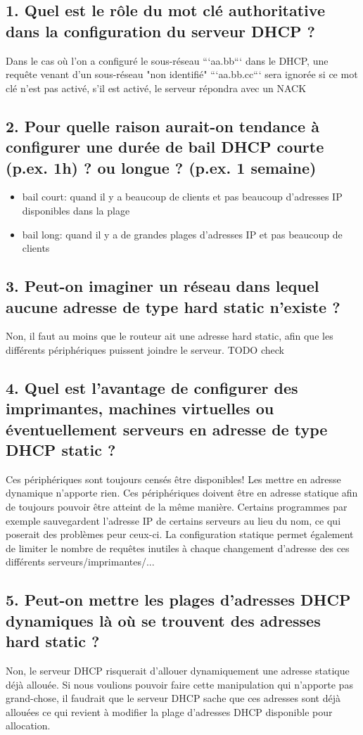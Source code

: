 \documentclass{article}
\begin{document}
\subsection*{1. Quel est le rôle du mot clé authoritative dans la configuration du serveur DHCP ?}
Dans le cas où l'on a configuré le sous-réseau ```aa.bb``` dans le DHCP, une requête venant d'un sous-réseau "non identifié" ```aa.bb.cc``` sera ignorée si ce mot clé n'est pas activé, s'il est activé, le serveur répondra avec un NACK

\subsection*{2. Pour quelle raison aurait-on tendance à configurer une durée de bail DHCP courte (p.ex. 1h) ? ou longue ? (p.ex. 1 semaine)}
\begin{itemize}
\item bail court: quand il y a beaucoup de clients et pas beaucoup d'adresses IP disponibles dans la plage
\item bail long: quand il y a de grandes plages d'adresses IP et pas beaucoup de clients
\end{itemize}

\subsection*{3. Peut-on imaginer un réseau dans lequel aucune adresse de type hard static n’existe ?}
Non, il faut au moins que le routeur ait une adresse hard static, afin que les différents périphériques puissent joindre le serveur.
TODO check

\subsection*{4. Quel est l’avantage de configurer des imprimantes, machines virtuelles ou éventuellement serveurs en adresse de type DHCP static ?}
Ces périphériques sont toujours censés être disponibles! Les mettre en adresse dynamique n'apporte rien. Ces périphériques doivent être en adresse statique afin de toujours pouvoir être atteint de la même manière. Certains programmes par exemple sauvegardent l'adresse IP de certains serveurs au lieu du nom, ce qui poserait des problèmes peur ceux-ci. La configuration statique permet également de limiter le nombre de requêtes inutiles à chaque changement d'adresse des ces différents serveurs/imprimantes/...

\subsection*{5. Peut-on mettre les plages d’adresses DHCP dynamiques là où se trouvent des adresses hard static ?}
Non, le serveur DHCP risquerait d'allouer dynamiquement une adresse statique déjà allouée. Si nous voulions pouvoir faire cette manipulation qui n'apporte pas grand-chose, il faudrait que le serveur DHCP sache que ces adresses sont déjà allouées ce qui revient à modifier la plage d'adresses DHCP disponible pour allocation.
\end{document}
